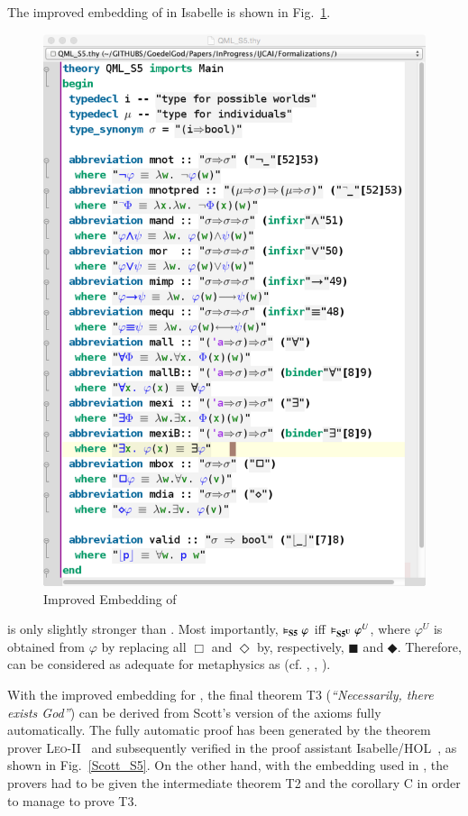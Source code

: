 \documentclass{article}
\newcommand{\Dia}{\Diamond} %
\newcommand{\BlackBox}{\blacksquare}
\newcommand{\BlackDia}{\Diamondblack}
\begin{document}
The improved embedding of \SFiveU in Isabelle is shown in Fig.~\ref{QML_S5}.
\begin{figure}
\centerline{\includegraphics[width=\columnwidth]{./Images/QML_S5.png}}
\caption{Improved Embedding of \SFiveU} \label{QML_S5}
\end{figure}

\SFiveU is only slightly stronger than \SFive. Most importantly, $\vDash_{\textbf{S5}} \varphi$ iff $\vDash_{\textbf{S5\textsuperscript{U}}} \varphi^{U}$, where $\varphi^U$ is obtained from $\varphi$ by replacing all $\Box$ and $\Dia$ by, respectively, $\BlackBox$ and $\BlackDia$. Therefore, \SFiveU can be considered as adequate for metaphysics as \SFive (cf. \cite{Mattey}, \cite[p. 127]{WilliamsonModalLogicAsMetaphysics}, \cite[ToDo]{DunnHardegree}). 


With the improved embedding for \SFiveU, the final theorem T3 (\textit{``Necessarily, there
exists God''}) can be derived from Scott's version of the axioms fully automatically. 
The fully automatic proof has been generated by the theorem prover \textsc{Leo-II}~\cite{C26} 
and subsequently verified in the proof assistant Isabelle/HOL~\cite{NPW02}, as shown in Fig.~\ref{Scott_S5}. 
On the other hand, with the embedding used in , 
the provers had to be given the intermediate theorem T2 and the corollary C in order to manage to prove T3. 
\end{document}
